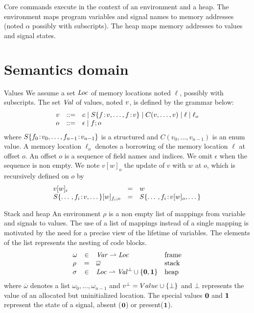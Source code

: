Core \sail{} commands execute in the context of an environment and a heap. The environment maps program
variables and signal names to memory addresses (noted $\alpha$ possibly with subscripts).
The heap maps memory addresses to values and signal states.

\section{Semantics domain}
\begin{paragraph}{Values}
  We assume a set ${\mathit{Loc}}$ of memory locations noted $\ell$, possibly with subscripts.
  The set ${\mathit{Val}}{}$ of \sail{} values, noted $v{}$, is defined by the grammar below:
  $$
    \begin{array}{lcl} v & ::= & c \mid S\{f\!:\!v, \ldots, f\!:\!v\} \mid C(v,\ldots,v)
             \mid \ell \mid \ell_o                                                             \\
             o       & ::= & \epsilon \mid f;o
    \end{array}
  $$
  where $S\{f_0\!:\!v_0,\ldots,f_{n-1}\!:\!v_{n-1}\}$ is a structured
  and $C(v_0,\ldots,v_{n-1})$ is an enum value. A memory location $\ell_o$ denotes a borrowing
  of the memory location $\ell$ at offset $o$.
  An offset $o$ is a sequence of field names and indices. We omit $\epsilon$ when the sequence is non empty.
  We note $v[w]_o$ the update of $v$ with $w$ at $o$, which is recursively defined on $o$ by
  $$
    \begin{array}{lcl}
      v[w]_{\epsilon}                            & = & w \\
      S\{\dotso,f_{i}\!:\!v,\dotso\}[w]_{f_i;o} & = &
      S\{\dotso,f_{i}\!:\!v[w]_o,\dotso\}
    \end{array}
  $$
\end{paragraph}
\begin{paragraph}{Stack and heap} An environment $\rho$ is a non empty list of mappings
  from variable and signals to values. The use of a list of mappings instead of a single mapping is motivated by the need
  for a precise view of the lifetime of variables. The elements of the list represents the nesting of code
  blocks.
  $$
    \begin{array}{lcll}
      \omega & \in & {\mathit{Var}} \rightharpoonup {\mathit{Loc}}                             & {\text{frame}} \\
      \rho   & =   & \overline{\omega}                                                 & {\text{stack}} \\
      \sigma & \in & {\mathit{Loc}} \rightharpoonup {\mathit{Val}}^\bot \cup\{{\bf{0}}, {\bf{1}}\} & {\text{heap}}
    \end{array}
  $$
  where $\overline{\omega}$ denotes a list $\omega_0,\ldots,\omega_{n-1}$ and
  $v^\bot = Value \cup \{\bot\}$ and $\bot$ represents the value of an allocated but uninitialized location.
  The special values ${\bf{0}}$ and ${\bf{1}}$ represent the state of a signal, absent (${\bf{0}}$) or present(${\bf{1}}$).
\end{paragraph}
